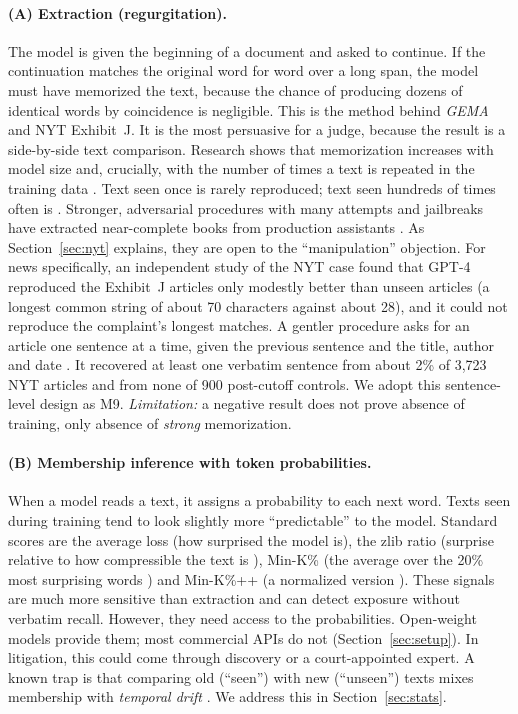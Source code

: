 \documentclass[10pt,a4paper]{article}
\begin{document}
\paragraph{(A) Extraction (regurgitation).} The model is given the beginning of a document and asked to continue. If the
continuation matches the original word for word over a long span, the model must have memorized the text, because
the chance of producing dozens of identical words by coincidence is negligible. This is the method behind
\emph{GEMA} and NYT Exhibit~J. It is the most persuasive for a judge, because the result is a side-by-side text
comparison. Research shows that memorization increases with model size and, crucially, with the number of times a
text is repeated in the training data \cite{carlini2023}. Text seen once is rarely reproduced; text seen hundreds of
times often is \cite{carlini2021,nasr2023}. Stronger, adversarial procedures with many attempts and jailbreaks have
extracted near-complete books from production assistants \cite{ahmed2026}. As Section~\ref{sec:nyt} explains, they are
open to the ``manipulation'' objection. For news specifically, an independent study of the NYT case
\cite{freeman2024} found that GPT-4 reproduced the Exhibit~J articles only modestly better than unseen articles (a
longest common string of about 70 characters against about 28), and it could not reproduce the complaint's longest
matches. A gentler procedure asks for an article one sentence at a time, given the previous sentence and the title,
author and date \cite{su2024}. It recovered at least one verbatim sentence from about 2\% of 3,723 NYT articles and
from none of 900 post-cutoff controls. We adopt this sentence-level design as M9.
\emph{Limitation:} a negative result does not prove absence of training, only absence of \emph{strong} memorization.

\paragraph{(B) Membership inference with token probabilities.} When a model reads a text, it assigns a probability to
each next word. Texts seen during training tend to look slightly more ``predictable'' to the model. Standard scores
are the average loss (how surprised the model is), the zlib ratio (surprise relative to how compressible the text
is \cite{carlini2021}), Min-K\% (the average over the 20\% most surprising words \cite{shi2024}) and Min-K\%++ (a
normalized version \cite{zhang2024}). These signals are much more sensitive than extraction and can detect exposure
without verbatim recall. However, they need access to the probabilities. Open-weight models provide them; most
commercial APIs do not (Section~\ref{sec:setup}). In litigation, this could come through discovery or a court-appointed
expert. A known trap is that comparing old (``seen'') with new (``unseen'') texts mixes membership with
\emph{temporal drift} \cite{duan2024,das2024}. We address this in Section~\ref{sec:stats}.
\end{document}
